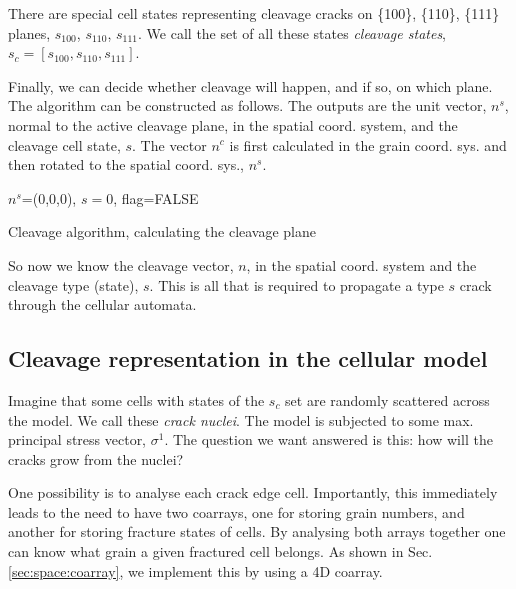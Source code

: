There are special cell states representing
cleavage cracks on \{100\}, \{110\}, \{111\} planes,
$s_{100}$, $s_{110}$, $s_{111}$.
We call the set of all these states {\em cleavage states},
$s_c=[s_{100}, s_{110}, s_{111}]$.

Finally, we can decide whether cleavage will happen,
and if so, on which plane.
The algorithm can be constructed as follows.
The outputs are the unit vector, $n^s$, normal to the
active cleavage plane, in the spatial coord. system,
and the cleavage cell state, $s$.
The vector $n^c$ is first calculated in the grain
coord. sys. and then rotated to the spatial coord. sys.,
$n^s$.

\begin{algorithm}[H]
\SetAlgoLined

\BlankLine
{$n^s$=(0,0,0), $s=0$, flag=FALSE}\;
\caption{
Cleavage algorithm, calculating
the cleavage plane}
\label{algo:clvg1:n}
\end{algorithm}

So now we know the cleavage vector, $n$,
in the spatial coord. system
and the cleavage type (state), $s$.
This is all that is required to propagate a
type $s$ crack through the cellular automata.

\subsection{Cleavage representation in the cellular model}

Imagine that some cells with states
of the $s_c$ set are
randomly scattered across the model.
We call these {\em crack nuclei}.
The model is subjected to some max. principal
stress vector, $\sigma^1$.
The question we want answered is this:
how will the cracks grow from the nuclei?

One possibility is to analyse each 
crack edge cell.
Importantly, this immediately leads to the
need to have two coarrays, one for storing
grain numbers, and another for storing
fracture states of cells.
By analysing both arrays together one
can know what grain a given fractured
cell belongs.
As shown in Sec. \ref{sec:space:coarray},
we implement this by using a 4D coarray.

